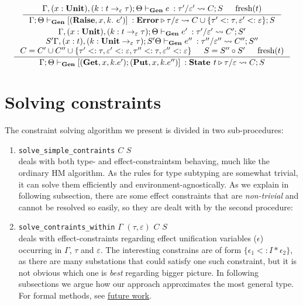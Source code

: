 \documentclass[declaration,shortabstract]{iithesis}
\theoremstyle{definition} \newtheorem{definition}{Definition}[section]
\newcommand{\gens}[6][\Gamma;\Theta]{\ensuremath{{{#1} \vdash_\textbf{Gen} {#2} \: : {#3}/{#4}} \rightsquigarrow {#5};{#6}}}
\newcommand{\arrow}[3]{{#1}\rightarrow_{#2}{#3}}
\newcommand{\fresh}[1]{\ensuremath{\operatorname{fresh}({#1})}}
\begin{document}
\begin{gather*}
\begin{gathered}
\inference{ 
\gens[\Gamma,(x:\textbf{Unit}), (k:\arrow{t}{\varepsilon}{\tau});\Theta]{e}{\tau'}{\varepsilon'}{C}{S} &
\fresh{t}
}{
\gens{ [(\textbf{Raise}, x, k.\ e')]}{\textbf{Error}\triangleright \tau}{\varepsilon}{C\cup\{\tau' <: \tau, \varepsilon' <: \varepsilon\}}{S}
}
\\
\inference{
\gens[\Gamma,(x:\textbf{Unit}), (k:\arrow{t}{\varepsilon}{\tau});\Theta] 
{e'}{\tau'}{\varepsilon'}{C'}{S'}
\\
\gens[S'\Gamma,(x:t), (k:\arrow{\textbf{Unit}}{\varepsilon}{\tau});S' \Theta]
{e''}{\tau''}{\varepsilon''}{C''}{S''} \\
C = C' \cup C'' \cup \{ \tau' <: \tau,  \varepsilon' <: \varepsilon, \tau'' <: \tau,  \varepsilon'' <: \varepsilon \} &
S = S'' \circ S' & \fresh{t}
}{
\gens{ [(\textbf{Get}, x, k. e');(\textbf{Put}, x, k. e'')]}{\textbf{State } t\triangleright \tau}{\varepsilon}{C}{S}
}
\end{gathered}
\end{gather*}
\setlength{\jot}{3pt}

\section{Solving constraints}
The constraint solving algorithm we present is divided in two sub-procedures:
\begin{enumerate}
    \item \texttt{solve\_simple\_contraints} $C$ $S$\\
    deals with both type- and effect-constraintsm behaving, much like the ordinary HM algorithm.
    As the rules for type subtyping are somewhat trivial, it can solve them efficiently and environment-agnostically. As we explain in following subsection, there are some effect constraints that are \textit{non-trivial} and cannot be resolved so easily, so they are dealt with by the second procedure:
    
    \item \texttt{solve\_contraints\_within} $\Gamma$ $(\tau, \varepsilon)$ $C$ $S$ \\
    deals with effect-constraints regarding effect unification variables ($\epsilon$) occurring in $\Gamma$, $\tau$ and $\varepsilon$.
    The interesting constrains are of form $\{\epsilon_1 <: I * \epsilon_2\}$,
    as there are many substations that could satisfy one such constraint, but it is not obvious which one is \textit{best} regarding bigger picture.
    In following subsections we argue how our approach approximates the most general type.
    For formal methods, see \hyperlink{chapter.6}{future work}.
\end{enumerate}
\end{document}
